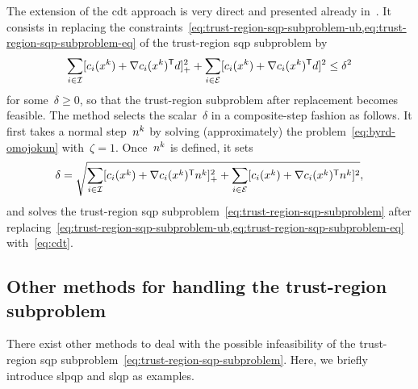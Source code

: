 The extension of the \gls{cdt} approach is very direct and presented already in~\cite[\S~15.4.4]{Conn_Gould_Toint_2000}.
It consists in replacing the constraints~\cref{eq:trust-region-sqp-subproblem-ub,eq:trust-region-sqp-subproblem-eq} of the trust-region \gls{sqp} subproblem by
\begin{equation}
    \label{eq:cdt}
    \sum_{i \in \iub} \posp{\con{i}(\iter[k]) + \nabla \con{i}(\iter[k])^{\T} \step}^2 + \sum_{i \in \ieq} [\con{i}(\iter[k]) + \nabla \con{i}(\iter[k])^{\T} \step]^2 \le \delta^2
\end{equation}
for some~$\delta \ge 0$, so that the trust-region subproblem after replacement becomes feasible.
The method selects the scalar~$\delta$ in a composite-step fashion as follows.
It first takes a normal step~$\nstep[k]$ by solving (approximately) the problem~\cref{eq:byrd-omojokun} with~$\zeta = 1$.
Once~$\nstep[k]$ is defined, it sets
\begin{equation*}
    \delta = \sqrt{\sum_{i \in \iub} \posp{\con{i}(\iter[k]) + \nabla \con{i}(\iter[k])^{\T} \nstep[k]}^2 + \sum_{i \in \ieq} [\con{i}(\iter[k]) + \nabla \con{i}(\iter[k])^{\T} \nstep[k]]^2},
\end{equation*}
and solves the trust-region \gls{sqp} subproblem~\cref{eq:trust-region-sqp-subproblem} after replacing~\cref{eq:trust-region-sqp-subproblem-ub,eq:trust-region-sqp-subproblem-eq} with~\cref{eq:cdt}.

\subsection{Other methods for handling the trust-region  subproblem}

There exist other methods to deal with the possible infeasibility of the trust-region \gls{sqp} subproblem~\cref{eq:trust-region-sqp-subproblem}.
Here, we briefly introduce \gls{slpqp} and \gls{slqp} as examples.


